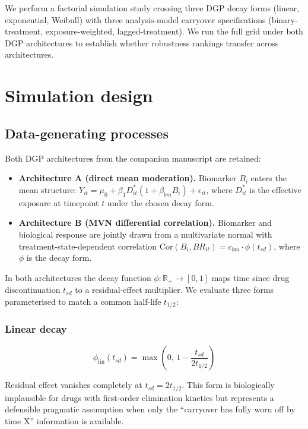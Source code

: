 \documentclass[
]{article}
\providecommand{\tightlist}{%
  \setlength{\itemsep}{0pt}\setlength{\parskip}{0pt}}
\begin{document}
We perform a factorial simulation study crossing three DGP decay
forms (linear, exponential, Weibull) with three analysis-model
carryover specifications (binary-treatment, exposure-weighted,
lagged-treatment). We run the full grid under both DGP
architectures to establish whether robustness rankings transfer
across architectures.

\section{Simulation design}\label{simulation-design}

\subsection{Data-generating processes}\label{data-generating-processes}

Both DGP architectures from the companion manuscript are
retained:

\begin{itemize}
\tightlist
\item
  \textbf{Architecture A (direct mean moderation).} Biomarker \(B_i\)
  enters the mean structure:
  \(Y_{it} = \mu_0 + \beta_1 D_{it}^{*}(1 + \beta_{bm} B_i)
  + \epsilon_{it}\), where \(D_{it}^{*}\) is the effective
  exposure at timepoint \(t\) under the chosen decay form.
\item
  \textbf{Architecture B (MVN differential correlation).} Biomarker
  and biological response are jointly drawn from a multivariate
  normal with treatment-state-dependent correlation
  \(\text{Cor}(B_i, BR_{it}) = c_{bm} \cdot \phi(t_{sd})\), where
  \(\phi\) is the decay form.
\end{itemize}

In both architectures the decay function \(\phi : \mathbb{R}_+
\to [0, 1]\) maps time since drug discontinuation \(t_{sd}\) to a
residual-effect multiplier. We evaluate three forms
parameterised to match a common half-life \(t_{1/2}\):

\subsubsection{Linear decay}\label{linear-decay}

\[
\phi_{\text{lin}}(t_{sd}) =
  \max\left(0,\, 1 - \frac{t_{sd}}{2 t_{1/2}}\right)
\]

Residual effect vanishes completely at \(t_{sd} = 2 t_{1/2}\).
This form is biologically implausible for drugs with
first-order elimination kinetics but represents a defensible
pragmatic assumption when only the ``carryover has fully worn
off by time X'' information is available.
\end{document}
